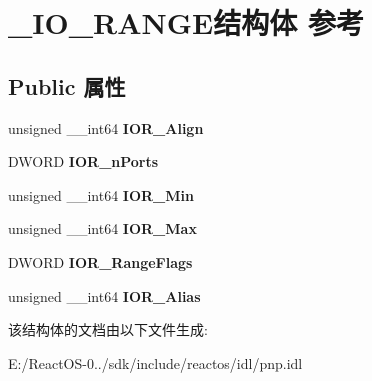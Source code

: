\hypertarget{struct___i_o___r_a_n_g_e}{}\section{\+\_\+\+I\+O\+\_\+\+R\+A\+N\+G\+E结构体 参考}
\label{struct___i_o___r_a_n_g_e}
\subsection*{Public 属性}
\begin{DoxyCompactItemize}
\item 
\mbox{\label{struct___i_o___r_a_n_g_e_a0f4b93623a95150853bc80a1f29452c1}} 
unsigned \+\_\+\+\_\+int64 {\bfseries I\+O\+R\+\_\+\+Align}
\item 
\mbox{\label{struct___i_o___r_a_n_g_e_a18a310b7ac5ddbfcf23dcbcc1df23f6a}} 
D\+W\+O\+RD {\bfseries I\+O\+R\+\_\+n\+Ports}
\item 
\mbox{\label{struct___i_o___r_a_n_g_e_a7c31ed81b85472242e649dfd97a42d01}} 
unsigned \+\_\+\+\_\+int64 {\bfseries I\+O\+R\+\_\+\+Min}
\item 
\mbox{\label{struct___i_o___r_a_n_g_e_a812934238173ac17eb8bc62c45c76367}} 
unsigned \+\_\+\+\_\+int64 {\bfseries I\+O\+R\+\_\+\+Max}
\item 
\mbox{\label{struct___i_o___r_a_n_g_e_a9e220a91f09518c9e61f159bee33ab72}} 
D\+W\+O\+RD {\bfseries I\+O\+R\+\_\+\+Range\+Flags}
\item 
\mbox{\label{struct___i_o___r_a_n_g_e_a6ae48c87ff2cd1a3033c883ef488959c}} 
unsigned \+\_\+\+\_\+int64 {\bfseries I\+O\+R\+\_\+\+Alias}
\end{DoxyCompactItemize}


该结构体的文档由以下文件生成\+:\begin{DoxyCompactItemize}
\item 
E\+:/\+React\+O\+S-\/0../sdk/include/reactos/idl/pnp.\+idl\end{DoxyCompactItemize}
